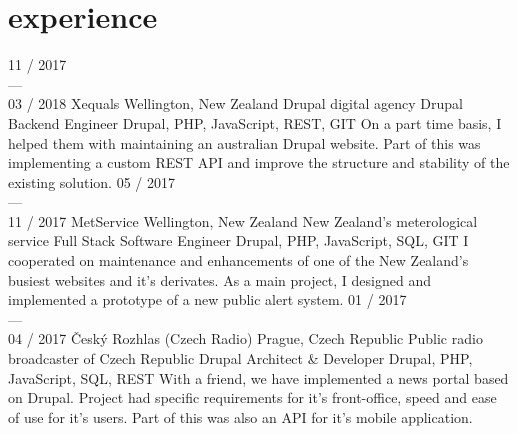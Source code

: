 \documentclass[]{friggeri-cv} %
\begin{document}
\bigskip

\section{experience}
\begin{entrylist}
  \job
  {11 / 2017 \\ --- \\ 03 / 2018}
  {Xequals}
  {Wellington, New Zealand}
  {Drupal digital agency}
  {
    \position
      {Drupal Backend Engineer}
      {Drupal, PHP, JavaScript, REST, GIT}
      {
        On a part time basis, I helped them with maintaining an australian Drupal website. Part of this
        was implementing a custom REST API and improve the structure and stability of the existing solution.
      }
  }
  \job
  {05 / 2017 \\ --- \\ 11 / 2017}
  {MetService}
  {Wellington, New Zealand}
  {New Zealand's meterological service}
  {
    \position
      {Full Stack Software Engineer}
      {Drupal, PHP, JavaScript, SQL, GIT}
      {
        I cooperated on maintenance and enhancements of one of the New Zealand's busiest websites and it's derivates.
        As a main project, I designed and implemented a prototype of a new public alert system.
      }
  }
  \job
  {01 / 2017 \\ --- \\ 04 / 2017}
  {Český Rozhlas (Czech Radio)}
  {Prague, Czech Republic}
  {Public radio broadcaster of Czech Republic}
  {
    \position
      {Drupal Architect \& Developer}
      {Drupal, PHP, JavaScript, SQL, REST}
      {
        With a friend, we have implemented a news portal based on Drupal. Project had specific requirements for
        it's front-office, speed and ease of use for it's users. Part of this was also an API for it's mobile application.
      }%
  }
  \job

\end{entrylist}
\end{document}
